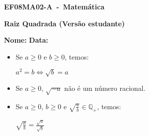 \documentclass[a4paper,14pt]{article}
\begin{document}
	
	\noindent\textbf{EF08MA02-A~-~Matemática} 
	
	\begin{center}
		\textbf{Raiz Quadrada (Versão estudante)}
	\end{center}
	
	\bigskip
	
	\noindent\textbf{Nome:} \underline{\hspace{10cm}}
    \noindent\textbf{Data:} \underline{\hspace{4cm}}
	
	\bigskip
	
	\begin{multicols}{2}
	\begin{itemize}
		\item Se $a \geq 0$ e $b \geq 0$, temos:
		\begin{center}
			$a^2 = b \Leftrightarrow \sqrt{b} = a$
		\end{center}
	    \item Se $a \geq 0$, $\sqrt{-a}$ não é um número racional.
	    \item Se $a \geq 0$, $b \geq 0$ e $\sqrt{\frac{a}{b}} \in \mathbb{Q_+}$, temos:
	    \begin{center}
	    	$\sqrt{\frac{a}{b}} = \frac{\sqrt{a}}{\sqrt{b}}$
	    \end{center}  
	\end{itemize}
	\begin{enumerate}
		

\end{enumerate}
\end{multicols}
\end{document}
